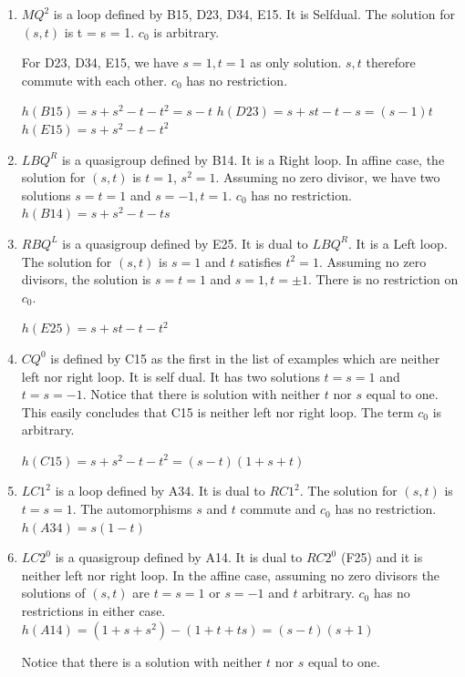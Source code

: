 \documentclass[11pt]{amsart}
\theoremstyle{definition}
\begin{document}
\begin{enumerate}
    
    
\item[(9)] $MQ^2$ is a loop defined by B15, D23, D34, E15. It is Selfdual. The solution for $(s,t)$ is t = s = 1. $c_0$ is arbitrary. 

    For D23, D34, E15, we have $s =1, t = 1$ as only solution. $s,t$ therefore commute with each other. $c_0$ has no restriction.
    
    $h(B15) = s+s^2 -t-t^2 = s-t$
    $h(D23) = s+st -t -s = (s-1)t$
    $h(E15) = s+s^2 -t -t^2$
    

    
    \item[(10)] $LBQ^R$ is a quasigroup defined by B14. It is a Right loop. In affine case, the solution for $(s,t)$ is $t=1$, $s^2=1$. Assuming no zero divisor, we have two solutions $s=t=1$ and $s=-1, t=1$. $c_0$ has no restriction.
    $h(B14) = s+s^2-t-ts$
    
    
    
    \item[(11)] $RBQ^L$ is a quasigroup defined by E25. It is  dual to $LBQ^R$. It is a Left loop. The solution for $(s,t)$ is $s=1$ and $t$ satisfies $t^2=1$. Assuming no zero divisors, the solution is $s=t=1$ and $s=1, t= \pm 1$. There is no restriction on $c_0$.

    $h(E25) = s+st -t -t^2$

    
    \item[(12)] $CQ^0$ is defined by C15 as the first in the list of examples which are neither left nor right loop. It is self dual. It has two solutions $t=s=1$ and $t=s=-1$. Notice that there is solution with neither $t$ nor $s$ equal to one. This easily concludes that C15 is neither left nor right loop. The term $c_0$ is arbitrary. 

    $h(C15) = s+s^2 -t-t^2 = (s-t)(1+s+t)$

   
\item[(13)] $LC1^2$ is a loop defined by A34. It is dual to $RC1^2$. The solution for $(s,t)$ is $t=s=1$. The automorphisms $s$ and $t$  commute and $c_0$ has no restriction.
$h(A34) = s(1-t)$
\item[(14)] $LC2^0$ is a quasigroup defined by A14. It is dual to $RC2^0$ (F25) and it is neither left nor right loop. In the affine case, assuming no zero divisors the solutions of $(s,t)$ are $t=s=1$ or $s=-1$ and $t$ arbitrary. $c_0$ has no restrictions in either case.
$h(A14)=(1+s+s^2) - (1+t+ts)=(s-t)(s+1)$

    Notice that there is a solution with neither $t$ nor $s$ equal to one.
    

\end{enumerate}
\end{document}
